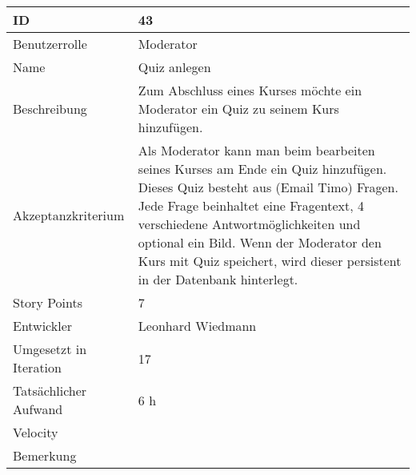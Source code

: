 \begin{tabularx}{\textwidth}{|p{}|X|}
	\hline
	ID & 43\\
	\hline
	Benutzerrolle & Moderator\\
	\hline
	Name & Quiz anlegen\\
	\hline
	Beschreibung & Zum Abschluss eines Kurses möchte ein Moderator ein Quiz zu seinem Kurs hinzufügen. \\
	\hline
	Akzeptanzkriterium & Als Moderator kann man beim bearbeiten seines Kurses am Ende ein Quiz hinzufügen. Dieses Quiz besteht aus (Email Timo) Fragen. Jede Frage beinhaltet eine Fragentext, 4 verschiedene Antwortmöglichkeiten und optional ein Bild. Wenn der Moderator den Kurs mit Quiz speichert, wird dieser persistent in der Datenbank hinterlegt.\\
	\hline
	Story Points & 7\\
	\hline
	Entwickler & Leonhard Wiedmann\\
	\hline
	Umgesetzt in Iteration & 17\\
	\hline
	Tatsächlicher Aufwand & 6 h\\
	\hline
	Velocity & \\
	\hline
	Bemerkung & \\
	\hline
\end{tabularx}
\vspace{20pt}
